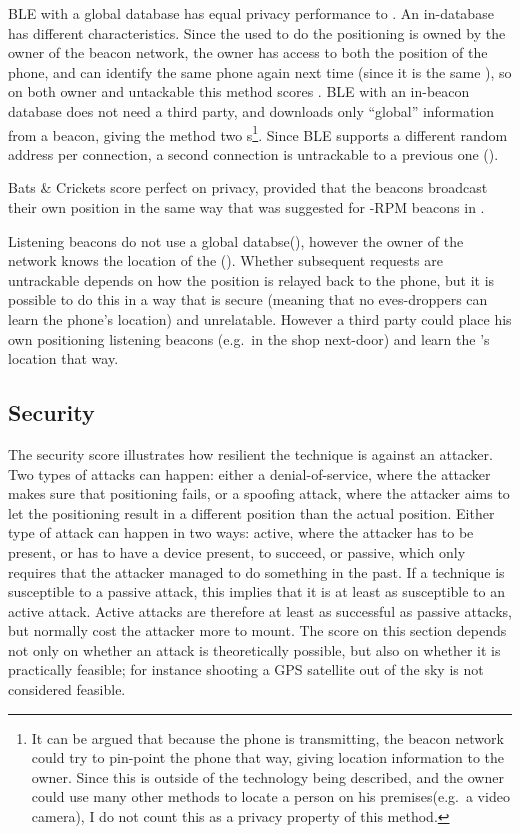 BLE with a global database has equal privacy performance to \wifi.
An in-\app database has different characteristics.
Since the \app used to do the positioning is owned by the owner of the beacon network, the owner has access to both the position of the phone, and can identify the same phone again next time (since it is the same \app), so on both owner and untackable this method scores \no.
BLE with an in-beacon database does not need a third party, and downloads only ``global'' information from a beacon, giving the method two \yes s\footnote{It can be argued that because the phone is transmitting, the beacon network could try to pin-point the phone that way, giving location information to the owner. Since this is outside of the technology being described, and the owner could use many other methods to locate a person on his premises(e.g.\ a video camera), I do not count this as a privacy property of this method.}.
Since BLE supports a different random address per connection, a second connection is untrackable to a previous one (\yes).

Bats \& Crickets score perfect on privacy, provided that the beacons broadcast their own position in the same way that was suggested for \aBRP-RPM beacons in .

Listening beacons do not use a global databse(\yes), however the owner of the network knows the location of the \device (\no).
Whether subsequent requests are untrackable depends on how the position is relayed back to the phone, but it is possible to do this in a way that is secure (meaning that no eves-droppers can learn the phone's location) and unrelatable.
However a third party could place his own positioning listening beacons (e.g.\ in the shop next-door) and learn the \device's location that way.

\subsection{Security}
The security score illustrates how resilient the technique is against an attacker.
Two types of attacks can happen: either a denial-of-service, where the attacker makes sure that positioning fails, or a spoofing attack, where the attacker aims to let the positioning result in a different position than the actual position.
Either type of attack can happen in two ways: active, where the attacker has to be present, or has to have a device present, to succeed, or passive, which only requires that the attacker managed to do something in the past.
If a technique is susceptible to a passive attack, this implies that it is at least as susceptible to an active attack.
Active attacks are therefore at least as successful as passive attacks, but normally cost the attacker more to mount.
The score on this section depends not only on whether an attack is theoretically possible, but also on whether it is practically feasible; for instance shooting a GPS satellite out of the sky is not considered feasible.

